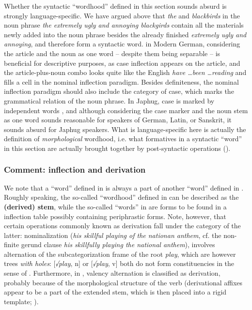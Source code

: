 \documentclass[a4paper, oneside, scheme=plain, 12pt]{article}
\newcommand*{\citepage}[1]{p.~{#1}}
\newcommand*{\concept}[1]{\textbf{#1}}
\newcommand{\form}[1]{\emph{#1}}
\begin{document}
Whether the syntactic ``wordhood'' defined in this section sounds absurd is strongly language-specific.
We have argued above that \form{the} and \form{blackbirds}
in the noun phrase \form{the extremely ugly and annoying blackgirds}
contain all the materials newly added into the noun phrase
besides the already finished \form{extremely ugly and annoying},
and therefore form a syntactic word.
in Modern German, considering the article and the noun as one word
-- despite them being separable -- is beneficial for descriptive purposes,
as case inflection appears on the article,
and the article-plus-noun combo looks quite like the English \form{have \dots been \dots reading}
and fills a cell in the nominal inflection paradigm.
Besides definiteness, the nominal inflection paradigm should also include the category of case,
which marks the grammatical relation of the noun phrase.
In Japhug, case is marked by independent words \citep[\citepage{8.2.1}]{jacques2021grammar},
and although considering the case marker and the noun stem as one word sounds reasonable for
speakers of German, Latin, or Sanskrit,
it sounds absurd for Japhug speakers.
What is language-specific here is actually the definition of 
\emph{morphological} wordhood, i.e. what formatives in a syntactic ``word'' in this section
are actually brought together by post-syntactic operations ().

\subsubsection{Comment: inflection and derivation}\label{sec:inflection-derivation}

We note that a ``word'' defined in 
is always a part of another ``word'' defined in .
Roughly speaking, the so-called ``wordhood'' defined in 
can be described as the \concept{(derived) stem},
while the so-called ``words'' in 
are forms to be found in a inflection table possibly containing periphrastic forms.
Note, however, that certain operations commonly known as derivation
fall under the category of the latter:
nominalization (\form{his skillful playing of the nationan anthem},
cf. the non-finite gerund clause \form{his skillfully playing the national anthem}),
involves alternation of the subcategorization frame of the root \form{play},
which are however trees \emph{with holes}:
[\form{√play}, n] or [\form{√play}, v] both do not form constituencies
in the sense of .
Furthermore, in \citet{jacques2021grammar}, valency alternation is classified as derivation,
probably because of the morphological structure of the verb
(derivational affixes appear to be a part of the extended stem,
which is then placed into a rigid template; ).
\end{document}

